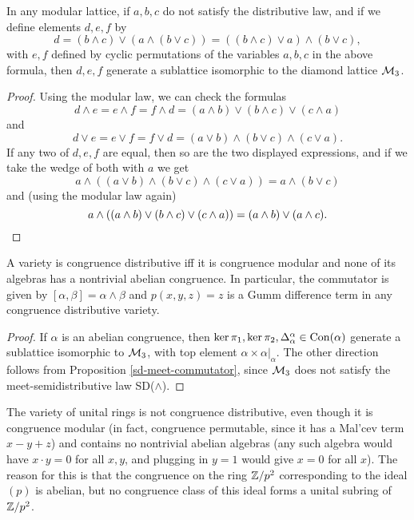 \begin{appendices}
\begin{prop}\label{distributive-m3} In any modular lattice, if $a,b,c$ do not satisfy the distributive law, and if we define elements $d,e,f$ by
\[
d = (b \wedge c) \vee (a \wedge (b \vee c)) = ((b\wedge c) \vee a)\wedge (b\vee c),
\]
with $e,f$ defined by cyclic permutations of the variables $a,b,c$ in the above formula, then $d,e,f$ generate a sublattice isomorphic to the diamond lattice $\mathcal{M}_3$.
\end{prop}
\begin{proof} Using the modular law, we can check the formulas
\[
d \wedge e = e \wedge f = f \wedge d = (a\wedge b)\vee (b\wedge c) \vee (c \wedge a)
\]
and
\[
d \vee e = e \vee f = f \vee d = (a\vee b)\wedge (b\vee c) \wedge (c \vee a).
\]
If any two of $d,e,f$ are equal, then so are the two displayed expressions, and if we take the wedge of both with $a$ we get
\[
a \wedge ((a\vee b)\wedge (b\vee c) \wedge (c \vee a)) = a \wedge (b \vee c)
\]
and (using the modular law again)
\[
a\wedge ((a\wedge b)\vee (b\wedge c) \vee (c \wedge a)) = (a \wedge b) \vee (a \wedge c).\qedhere
\]
\end{proof}

\begin{prop} A variety is congruence distributive iff it is congruence modular and none of its algebras has a nontrivial abelian congruence. In particular, the commutator is given by $[\alpha,\beta] = \alpha\wedge \beta$ and $p(x,y,z) = z$ is a Gumm difference term in any congruence distributive variety.
\end{prop}
\begin{proof} If $\alpha$ is an abelian congruence, then $\ker \pi_1, \ker \pi_2, \Delta_\alpha^\alpha \in \operatorname{Con}(\alpha)$ generate a sublattice isomorphic to $\mathcal{M}_3$, with top element $\alpha \times \alpha|_\alpha$. The other direction follows from Proposition \ref{sd-meet-commutator}, since $\mathcal{M}_3$ does not satisfy the meet-semidistributive law SD($\wedge$).
\end{proof}

\begin{ex} The variety of unital rings is not congruence distributive, even though it is congruence modular (in fact, congruence permutable, since it has a Mal'cev term $x-y+z$) and contains no nontrivial abelian algebras (any such algebra would have $x\cdot y = 0$ for all $x,y$, and plugging in $y = 1$ would give $x = 0$ for all $x$). The reason for this is that the congruence on the ring $\mathbb{Z}/p^2$ corresponding to the ideal $(p)$ is abelian, but no congruence class of this ideal forms a unital subring of $\mathbb{Z}/p^2$.
\end{ex}


\end{appendices}
